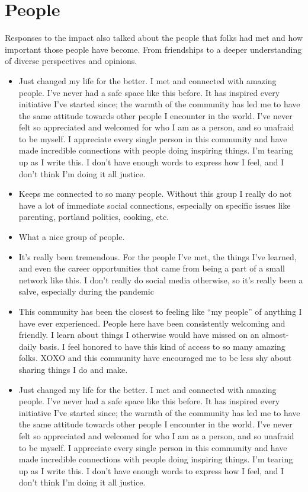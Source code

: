 \documentclass[
]{book}
\providecommand{\tightlist}{%
  \setlength{\itemsep}{0pt}\setlength{\parskip}{0pt}}
\begin{document}
\section{People}\label{people}

Responses to the impact also talked about the people that folks had met and how important those people have become. From friendships to a deeper understanding of diverse perspectives and opinions.

\begin{itemize}
\tightlist
\item
  Just changed my life for the better. I met and connected with amazing people. I've never had a safe space like this before. It has inspired every initiative I've started since; the warmth of the community has led me to have the same attitude towards other people I encounter in the world. I've never felt so appreciated and welcomed for who I am as a person, and so unafraid to be myself. I appreciate every single person in this community and have made incredible connections with people doing inspiring things. I'm tearing up as I write this. I don't have enough words to express how I feel, and I don't think I'm doing it all justice.
\item
  Keeps me connected to so many people. Without this group I really do not have a lot of immediate social connections, especially on specific issues like parenting, portland politics, cooking, etc.
\item
  What a nice group of people.
\item
  It's really been tremendous. For the people I've met, the things I've learned, and even the career opportunities that came from being a part of a small network like this. I don't really do social media otherwise, so it's really been a salve, especially during the pandemic
\item
  This community has been the closest to feeling like ``my people'' of anything I have ever experienced. People here have been consistently welcoming and friendly. I learn about things I otherwise would have missed on an almost-daily basis. I feel honored to have this kind of access to so many amazing folks. XOXO and this community have encouraged me to be less shy about sharing things I do and make.
\item
  Just changed my life for the better. I met and connected with amazing people. I've never had a safe space like this before. It has inspired every initiative I've started since; the warmth of the community has led me to have the same attitude towards other people I encounter in the world. I've never felt so appreciated and welcomed for who I am as a person, and so unafraid to be myself. I appreciate every single person in this community and have made incredible connections with people doing inspiring things. I'm tearing up as I write this. I don't have enough words to express how I feel, and I don't think I'm doing it all justice.

\end{itemize}
\end{document}
